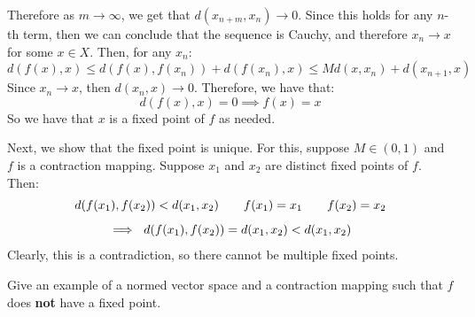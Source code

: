 \documentclass{article}
\begin{document}
\begin{soln}
    Therefore as $ m \rightarrow \infty $, we get that $ d(x_{n+m}, x_{n}) \rightarrow 0 $.
    Since this holds for any $ n $-th term, then we can conclude that the sequence is Cauchy,
    and therefore $ x_{n} \rightarrow x $ for some $ x \in X $.
    Then, for any $ x_{n} $:
    \begin{equation*}
        d(f(x), x) \leq d(f(x), f(x_{n})) + d(f(x_{n}), x) \leq Md(x, x_{n}) + d(x_{n+1}, x)
    \end{equation*}
    Since $ x_{n} \rightarrow x $, then $ d(x_{n}, x) \rightarrow 0 $. Therefore, we have that:
    \begin{equation*}
        d(f(x), x) = 0 \implies f(x) = x
    \end{equation*}
    So we have that $ x $ is a fixed point of $ f $ as needed.
\end{soln}

\begin{soln}[title=Uniqueness]
    Next, we show that the fixed point is unique.
    For this, suppose $ M \in (0, 1) $ and $ f $ is a contraction mapping. \vsp
    Suppose $ x_{1} $ and $ x_{2} $ are distinct fixed points of $ f $. Then:
    \begin{gather*}
        d(f(x_{1}), f(x_{2})) < d(x_{1}, x_{2}) \qquad
        f(x_{1}) = x_{1} \qquad
        f(x_{2}) = x_{2} \vsp
        \implies \ d(f(x_{1}), f(x_{2})) = d(x_{1}, x_{2}) < d(x_{1}, x_{2})
    \end{gather*}
    Clearly, this is a contradiction, so there cannot be multiple fixed points.
\end{soln}

\begin{qu}
    Give an example of a normed vector space and a contraction mapping such that $ f $ does
    \textbf{not} have a fixed point.
\end{qu}
\end{document}
